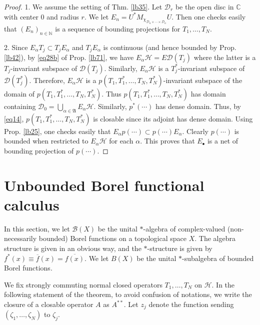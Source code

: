 \documentclass[12pt,b5paper,notitlepage]{article}
\theoremstyle{definition}
\theoremstyle{plain}
\newcommand{\fk}{\mathfrak}
\newcommand{\mc}{\mathcal}
\newcommand{\ovl}{\overline}
\newcommand{\Dom}{\scr D}
\newcommand{\scr}{\mathscr}
\newcommand{\blt}{\bullet}
\newcommand{\Cbb}{\mathbb C}
\newcommand{\Nbb}{\mathbb N}
\numberwithin{equation}{section}
\begin{document}
\begin{proof}
1. We assume the setting of Thm. \ref{lb35}. Let $\mc D_r$ be the open disc in $\Cbb$ with center $0$ and radius $r$. We let $E_n=U^*M_{\chi_{\mc D_n\times\cdots\times \mc D_n}}U$. Then one checks easily that $(E_n)_{n\in\Nbb}$ is a sequence of bounding projections for $T_1,\dots,T_N$.
	
2. Since $E_\alpha T_j\subset T_jE_\alpha$ and $T_jE_\alpha$ is continuous (and hence bounded by Prop. \ref{lb42}), by \eqref{eq28b} of Prop. \ref{lb71}, we have $E_\alpha\mc H=E\Dom(T_j)$ where the latter is a $T_j$-invariant subspace of $\Dom(T_j)$. Similarly, $E_\alpha\mc H$ is a $T_j^*$-invariant subspace of $\Dom(T_j^*)$. Therefore, $E_\alpha\mc H$ is a $p(T_1,T_1^*,\dots,T_N,T_N^*)$-invariant subspace of the domain of  $p(T_1,T_1^*,\dots,T_N,T_N^*)$. Thus $p(T_1,T_1^*,\dots,T_N,T_N^*)$ has domain containing $\Dom_0=\bigcup_{\alpha\in\fk A}E_\alpha\mc H$. Similarly, $p^*(\cdots)$ has dense domain. Thus, by \eqref{eq14}, $p(T_1,T_1^*,\dots,T_N,T_N^*)$ is closable since its adjoint has dense domain. Using Prop. \ref{lb25}, one checks easily that $E_\alpha p(\cdots)\subset p(\cdots)E_\alpha$. Clearly $p(\cdots)$ is bounded when restricted to $E_\alpha\mc H$ for each $\alpha$. This proves that $E_\blt$ is a net of bounding projection of $p(\cdots)$.
\end{proof}


\section{Unbounded Borel functional calculus}


In this section, we let $\scr B(X)$ \index{BX@$\scr B(X),B(X)$} be the unital $*$-algebra of complex-valued (non-necessarily bounded) Borel functions on a topological space $X$. The algebra structure is given in an obvious way, and the $*$-structure is given by $f^*(x)\equiv\ovl f(x)=\ovl{f(x)}$. We let $B(X)$ be the unital $*$-subalgebra of bounded Borel functions.




We fix strongly commuting normal closed operators $T_1,\dots,T_N$ on $\mc H$. In the following statement of the theorem, to avoid confusion of notations, we write the closure of a closable operator $A$ as $A^{**}$. Let $z_j$ denote the function sending $(\zeta_1,\dots,\zeta_N)$ to $\zeta_j$.
\end{document}
